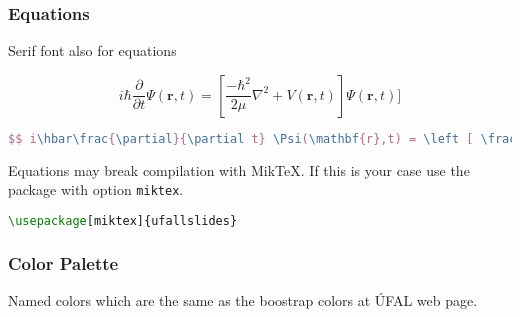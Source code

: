 \documentclass[handout,aspectratio=169]{beamer}
\begin{document}

\begin{frame}[fragile]
    \frametitle{Equations}

    \centering Serif font also for equations

    $$i\hbar\frac{\partial}{\partial t} \Psi(\mathbf{r},t) = \left [ \frac{-\hbar^2}{2\mu}\nabla^2 + V(\mathbf{r},t)\right ] \Psi(\mathbf{r},t) ]$$

    \begin{lstlisting}[language=TeX]
$$ i\hbar\frac{\partial}{\partial t} \Psi(\mathbf{r},t) = \left [ \frac{-\hbar^2}{2\mu}\nabla^2 + V(\mathbf{r},t)\right ] \Psi(\mathbf{r},t) ]$$
    \end{lstlisting}

    Equations may break compilation with Mik\TeX. If this is your case use the
    package with option \lstinline[language=TeX]{miktex}.

\begin{lstlisting}[language=TeX]
    \usepackage[miktex]{ufallslides}
\end{lstlisting}

\end{frame}


\begin{frame}
    \frametitle{Color Palette}

    Named colors which are the same as the boostrap colors at ÚFAL web page.\\[15pt]

    \begin{center}
    \end{center}

\end{frame}
\end{document}
